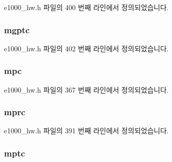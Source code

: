 e1000\+\_\+hw.\+h 파일의 400 번째 라인에서 정의되었습니다.

\subsubsection[{\texorpdfstring{mgptc}{mgptc}}]{ mgptc}\hypertarget{structe1000__hw__stats_aacbb3a29673462472463e2995cb0cf1c}{}\label{structe1000__hw__stats_aacbb3a29673462472463e2995cb0cf1c}


e1000\+\_\+hw.\+h 파일의 402 번째 라인에서 정의되었습니다.

\subsubsection[{\texorpdfstring{mpc}{mpc}}]{ mpc}\hypertarget{structe1000__hw__stats_a8c30a219ea0973c03af26f90b02b80dc}{}\label{structe1000__hw__stats_a8c30a219ea0973c03af26f90b02b80dc}


e1000\+\_\+hw.\+h 파일의 367 번째 라인에서 정의되었습니다.

\subsubsection[{\texorpdfstring{mprc}{mprc}}]{ mprc}\hypertarget{structe1000__hw__stats_ae229a3f28b38be564ee22548acd6bbae}{}\label{structe1000__hw__stats_ae229a3f28b38be564ee22548acd6bbae}


e1000\+\_\+hw.\+h 파일의 391 번째 라인에서 정의되었습니다.

\subsubsection[{\texorpdfstring{mptc}{mptc}}]{ mptc}\hypertarget{structe1000__hw__stats_a92c5a9be8dc8b758afe7c53a27d8bda6}{}\label{structe1000__hw__stats_a92c5a9be8dc8b758afe7c53a27d8bda6}


